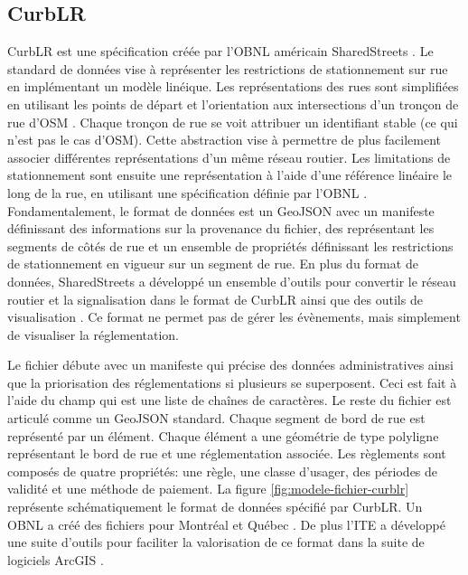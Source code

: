     \subsection{CurbLR}\label{ssec:data-format-curblr}
     CurbLR est une spécification créée par l'\ac{OBNL} américain SharedStreets \parencite{sharedstreets_about_2020}. Le standard de données vise à représenter les restrictions de stationnement sur rue en implémentant un modèle linéique. Les représentations des rues sont simplifiées en utilisant les points de départ et l'orientation aux intersections d'un tronçon de rue d'\ac{OSM} \parencite{sharedstreets_github_2018}. Chaque tronçon de rue se voit attribuer un identifiant stable (ce qui n'est pas le cas d'\ac{OSM}). Cette abstraction vise à permettre de plus facilement associer différentes représentations d'un même réseau routier. Les limitations de stationnement sont ensuite une représentation à l'aide d'une référence linéaire le long de la rue, en utilisant une spécification définie par l'\ac{OBNL} \parencite{eros_curblr_2025}. Fondamentalement, le format de données est un GeoJSON avec un manifeste définissant des informations sur la provenance du fichier, des \fg{} représentant les segments de côtés de rue et un ensemble de propriétés définissant les restrictions de stationnement en vigueur sur un segment de rue. En plus du format de données, SharedStreets a développé un ensemble d'outils pour convertir le réseau routier \parencite{sharedstreets_shared_2024} et la signalisation \parencite{sharedstreets_curblr_2020} dans le format de CurbLR ainsi que des outils de visualisation \parencite{sharedstreets_github_2021}. Ce format ne permet pas de gérer les évènements, mais simplement de visualiser la réglementation.\par
     Le fichier débute avec un manifeste qui précise des données administratives ainsi que la priorisation des réglementations si plusieurs se superposent. Ceci est fait à l'aide du champ \fg{} qui est une liste de chaînes de caractères. Le reste du fichier est articulé comme un GeoJSON standard. Chaque segment de bord de rue est représenté par un élément. Chaque élément a une géométrie de type polyligne représentant le bord de rue et une réglementation associée. Les règlements sont composés de quatre propriétés: une règle, une classe d'usager, des périodes de validité et une méthode de paiement. La figure \ref{fig:modele-fichier-curblr} représente schématiquement le format de données spécifié par CurbLR. Un \ac{OBNL} a créé des fichiers pour Montréal et Québec \parencite{fabrique_des_mobilites_carte_2022,fabrique_des_mobilites_fabmobqccurblr_2021,fabrique_des_mobilites_carte_2022}. De plus l'\ac{ITE} a développé une suite d'outils pour faciliter la valorisation de ce format dans la suite de logiciels ArcGIS \parencite{ite_ite-curbsidecurbside-management-tool_2021}.
     
